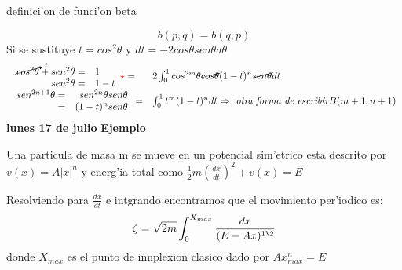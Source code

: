 \documentclass{article}
\theoremstyle{definition}
\begin{document}
\begin{center}
\fbox{\begin{minipage}{15em}
  \[b(p,q)=\frac{\Gamma (q)\Gamma (p)}{\Gamma (q+p)}\]
\end{minipage}} definici'on de funci'on beta
\end{center}
\[b(p,q)=b(q,p)\]
Si se sustituye $t=cos^2\theta$ y $dt=-2cos\theta sen\theta d\theta$
\[
\begin{array}{ll}
	\begin{array}{rl}
		\cancelto{t}{cos^2\theta}+sen^2\theta=&1\\
		sen^2\theta =&1-t
	\end{array} \textcolor{red}{\star}= & 2\int^{1}_0 cos^{2m}\theta\cancel{cos\theta} (1-t)^n\cancel{sen\theta}dt\\
	\begin{array}{rr}
		sen^{2n+1}\theta=&sen^{2n}\theta sen\theta\\
		=&(1-t)^n sen\theta
	\end{array} = & \int^{1}_0 t^m (1-t)^n dt\Rightarrow \textit{ otra forma de escribir} B(m+1,n+1)
\end{array}
\]
\newpage
\textbf{lunes 17 de julio}
\textbf{Ejemplo}

Una particula de masa m se mueve en un potencial sim'etrico esta descrito por $v(x)=A|x|^n$ y energ'ia total como $\frac{1}{2}m\left(\frac{dx}{dt}\right)^2 +v(x)=E$

Resolviendo para $\frac{dx}{dt}$ e intgrando encontramos que el movimiento per'iodico es:
\[\zeta=\sqrt{2m}\int^{X_{max}}_0\frac{dx}{(E-Ax)^{1\2}}\]
donde $X_{max}$ es el punto de innplexion clasico dado por $Ax_{max}^n=E$
\end{document}
